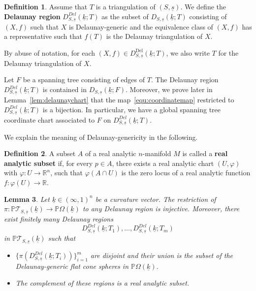 \documentclass{compositio}
\numberwithin{equation}{section}
\numberwithin{figure}{section}
\theoremstyle{definition}
\newtheorem{definition}{Definition}[section]
\theoremstyle{plain}
\newtheorem{lemma}[definition]{Lemma}
\begin{document}
{\begin{definition}
    Assume that $T$ is a triangulation of $(S, \underline{s})$. We define the \textbf{Delaunay region} $D_{S,\underline{s}}^{Del}(\underline{k}; T)$ as the subset of $D_{S,\underline{s}}(\underline{k};T)$ consisting of $(X,f)$ such that $X$ is Delaunay-generic and the equivalence class of $(X,f)$ has a representative such that $f(T)$ is the Delaunay triangulation of $X$.
\end{definition}
By abuse of notation, for each $(X,f)\in D_{S,\underline{s}}^{\mathrm{Del}}(\underline{k};T)$, we also write $T$ for the Delaunay triangulation of $X$.

Let $F$ be a spanning tree consisting of edges of $T$. The Delaunay region $D_{S,\underline{s}}^{Del}(\underline{k}; T)$ is contained in $D_{S,\underline{s}}(\underline{k};F)$. Moreover, we prove later in Lemma~\ref{lem:delaunaychart} that the map~\eqref{equ:coordinatemap} restricted to $D_{S,\underline{s}}^{Del}(\underline{k};T)$ is a bijection. In particular, we have a global spanning tree coordinate chart associated to $F$ on $D_{S,\underline{s}}^{Del}(\underline{k};T)$.\newline

We explain the meaning of Delaunay-genericity in the following.

\begin{definition}
    A subset $A$ of a real analytic $n$-manifold $M$ is called a \textbf{real analytic subset} if, for every $p\in A$, there exists a real analytic chart $(U, \varphi)$ with $\varphi: U \to \mathbb{R}^n$, such that $\varphi(A \cap U)$ is the zero locus of a real analytic function $f:\varphi(U)\to \mathbb{R}$.
\end{definition}

\begin{lemma}\label{lem:genericdelaunay}
Let $\underline{k}\in (\infty,1)^n$ be a curvature vector. The restriction of $\pi: \mathbb{P}\mathcal{T}_{S, \underline{s}}(\underline{k}) \to \mathbb{P}\Omega(\underline{k})$ to any Delaunay region is injective. Moreover, there exist finitely many Delaunay regions 
$$
D_{S,\underline{s}}^{Del}(\underline{k};T_1), \ldots, D_{S,\underline{s}}^{Del}(\underline{k};T_m)
$$ 
in $\mathbb{P}\mathcal{T}_{S, \underline{s}}(\underline{k})$ such that
\begin{itemize}
    \item $\{\pi(D_{S,\underline{s}}^{Del}(\underline{k};T_i))\}_{i=1}^m$ are disjoint and their union is the subset of the Delaunay-generic flat cone spheres in $\mathbb{P}\Omega(\underline{k})$.
    \item The complement of these regions is a real analytic subset.
\end{itemize}
\end{lemma}


}
\end{document}
